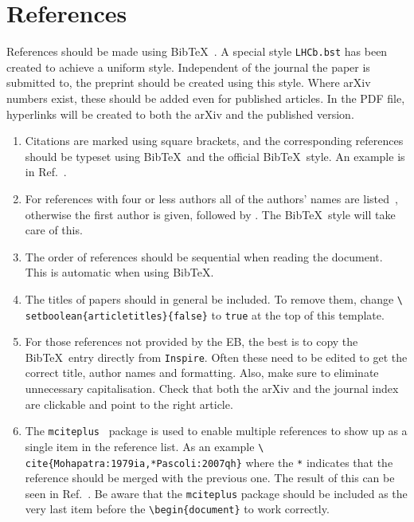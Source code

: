 \section{References}
\label{sec:References}

References should be made using Bib\TeX~\cite{BibTeX}. A special style
\texttt{LHCb.bst} has been created to achieve a uniform
style. Independent of the journal the paper is submitted to, the
preprint should be created using this style. Where arXiv numbers
exist, these should be added even for published articles. In the PDF
file, hyperlinks will be created to both the arXiv and the published
version.

\begin{enumerate}

\item Citations are marked using square brackets, and the
  corresponding references should be typeset using Bib\TeX\ and the
  official \lhcb Bib\TeX\ style. An example is in
  Ref.~\cite{Sjostrand:2006za}.

\item For references with four or less authors all of the authors'
  names are listed~\cite{Majorana:1937vz}, otherwise the first author
  is given, followed by \etal. The \lhcb Bib\TeX\ style will
  take care of this.

\item The order of references should be sequential when reading the
  document. This is automatic when using Bib\TeX.

\item The titles of papers should in general be included. To remove
  them, change \texttt{\textbackslash
    setboolean\{articletitles\}\{false\}} to \texttt{true} at the top
  of this template.

\item For those references not provided by the EB, the best
  is to copy the Bib\TeX\ entry directly from
  \texttt{Inspire}. Often these need to be edited to get the 
  correct title, author names and formatting.
  Also, make sure to eliminate unnecessary capitalisation.
  Check that both the arXiv and the journal index are clickable
  and point to the right article.
\item The \texttt{mciteplus}~\cite{mciteplus} package is used
  to enable multiple references to show up as a single item in the
  reference list. As an example \texttt{\textbackslash
    cite\{Mohapatra:1979ia,*Pascoli:2007qh\}} where the \texttt{*}
  indicates that the reference should be merged with the previous
  one. The result of this can be seen in
  Ref.~\cite{Mohapatra:1979ia,*Pascoli:2007qh}. Be aware that the
  \texttt{mciteplus} package should be included as the very last item
  before the \texttt{\textbackslash begin\{document\}} to work
  correctly.


\end{enumerate}

